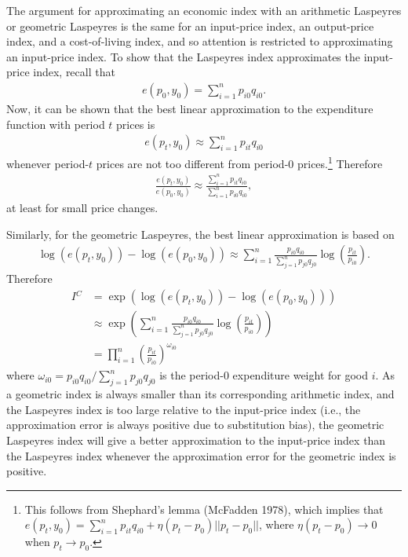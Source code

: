 \documentclass[]{article}
\begin{document}
The argument for approximating an economic index with an arithmetic Laspeyres or geometric Laspeyres is the same for an input-price index, an output-price index, and a cost-of-living index, and so attention is restricted to approximating an input-price index. To show that the Laspeyres index approximates the input-price index, recall that
\begin{align*}
e(p_{0}, y_{0}) = \sum_{i = 1}^{n} p_{i0} q_{i0}.
\end{align*}
Now, it can be shown that the best linear approximation to the expenditure function with period \(t\) prices is
\begin{align*}
e(p_{t}, y_{0}) \approx \sum_{i = 1}^{n} p_{it}q_{i0}
\end{align*}
whenever period-\(t\) prices are not too different from period-0 prices.\footnote{This follows from Shephard's lemma (McFadden 1978), which implies that \(e(p_{t}, y_{0}) = \sum_{i = 1}^{n} p_{it}q_{i0} + \eta(p_{t} - p_{0})||p_{t} - p_{0}||\), where \(\eta(p_{t} - p_{0}) \rightarrow 0\) when \(p_{t} \rightarrow p_{0}\).} Therefore
\begin{align*}
\frac{e(p_{t}, y_{0})}{e(p_{0}, y_{0})} \approx \frac{\sum_{i = 1}^{n} p_{it} q_{i0}}{\sum_{i = 1}^{n} p_{i0} q_{i0}},
\end{align*}
at least for small price changes.

Similarly, for the geometric Laspeyres, the best linear approximation is based on
\begin{align*}
\log(e(p_{t}, y_{0})) - \log(e(p_{0}, y_{0})) \approx \sum_{i = 1}^{n} \frac{p_{i0} q_{i0}}{\sum_{j = 1}^{n} p_{j0} q_{j0}} \log\left(\frac{p_{it}}{p_{i0}} \right).
\end{align*}
Therefore
\begin{align*}
I{^C} &= \exp(\log(e(p_{t}, y_{0})) - \log(e(p_{0}, y_{0}))) \\
&\approx \exp\left( \sum_{i = 1}^{n} \frac{p_{i0} q_{i0}}{\sum_{j = 1}^{n} p_{j0} q_{j0}} \log\left(\frac{p_{it}}{p_{i0}} \right) \right) \\
&= \prod_{i = 1}^{n} \left(\frac{p_{it}}{p_{i0}} \right)^{\omega_{i0}}
\end{align*}
where \(\omega_{i0} = p_{i0} q_{i0} / \sum_{j = 1}^{n} p_{j0} q_{j0}\) is the period-0 expenditure weight for good \(i\). As a geometric index is always smaller than its corresponding arithmetic index, and the Laspeyres index is too large relative to the input-price index (i.e., the approximation error is always positive due to substitution bias), the geometric Laspeyres index will give a better approximation to the input-price index than the Laspeyres index whenever the approximation error for the geometric index is positive.
\end{document}
